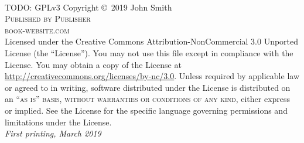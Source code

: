\documentclass[11pt,fleqn]{book} %
\begin{document}

\begingroup
\thispagestyle{empty} %
\vfill
\endgroup


\newpage
~\vfill
\thispagestyle{empty}

\noindent TODO: GPLv3 Copyright \copyright\ 2019 John Smith\\ %

\noindent \textsc{Published by Publisher}\\ %

\noindent \textsc{book-website.com}\\ %

\noindent Licensed under the Creative Commons Attribution-NonCommercial 3.0 Unported License (the ``License''). You may not use this file except in compliance with the License. You may obtain a copy of the License at \url{http://creativecommons.org/licenses/by-nc/3.0}. Unless required by applicable law or agreed to in writing, software distributed under the License is distributed on an \textsc{``as is'' basis, without warranties or conditions of any kind}, either express or implied. See the License for the specific language governing permissions and limitations under the License.\\ %

\noindent \textit{First printing, March 2019} %
\end{document}
